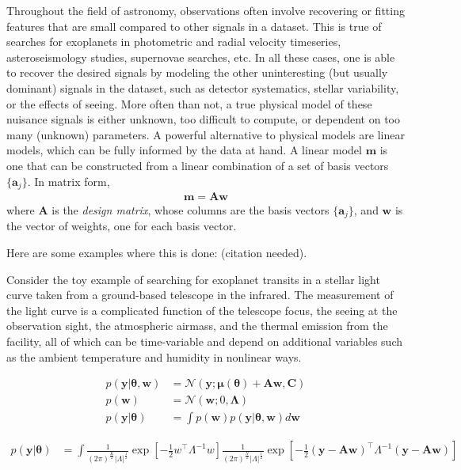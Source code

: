 \documentclass{rnaastex}
\newcommand{\bvec}[1]{{\ensuremath{\boldsymbol{#1}}}}
\newcommand{\citeme}{{\color{red}(citation needed)}}
\newcommand{\Gaussian}[3]{\ensuremath{\frac{1}{(2\pi)^\frac{#3}{2}|#2|^\frac{1}{2}} \exp\left[ -\frac{1}{2}#1^\top #2^{-1} #1 \right]}}
\begin{document}
Throughout the field of astronomy, observations often involve recovering or fitting features that are small compared to other signals in a dataset. This is true of searches for exoplanets in photometric and radial velocity timeseries, asteroseismology studies, supernovae searches, etc. In all these cases, one is able to recover the desired signals by modeling the other uninteresting (but usually dominant) signals in the dataset, such as detector systematics, stellar variability, or the effects of seeing. More often than not, a true physical model of these nuisance signals is either unknown, too difficult to compute, or dependent on too many (unknown) parameters. A powerful alternative to physical models are linear models, which can be fully informed by the data at hand. A linear model $\bvec{m}$ is one that can be constructed from a linear combination of a set of basis vectors $\{\bvec{a}_j\}$. In matrix form,
%
\begin{align}
\bvec{m} = \bvec{A} \bvec{w}
\end{align}
%
where $\bvec{A}$ is the \emph{design matrix}, whose columns are the basis vectors $\{\bvec{a}_j\}$, and $\bvec{w}$ is the vector of weights, one for each basis vector.

Here are some examples where this is done: \citeme.

Consider the toy example of searching for exoplanet transits in a stellar light curve taken from a ground-based telescope in the infrared. The measurement of the light curve is a complicated function of the telescope focus, the seeing at the observation sight, the atmospheric airmass, and the thermal emission from the facility, all of which can be time-variable and depend on additional variables such as the ambient temperature and humidity in nonlinear ways.

\begin{align}
p(\bvec{y} | \bvec{\theta}, \bvec{w}) &= \mathcal{N}(\bvec{y}; \bvec{\mu}(\bvec{\theta}) + \bvec{A}\bvec{w}, \bvec{C}) \nonumber\\
%
p(\bvec{w}) &= \mathcal{N}(\bvec{w}; 0, \bvec{\Lambda}) \nonumber\\
%
p(\bvec{y} | \bvec{\theta}) &= \int p(\bvec{w}) p(\bvec{y} | \bvec{\theta}, \bvec{w}) d\bvec{w}
\end{align}

\begin{align}
p(\bvec{y} | \bvec{\theta}) &=  \int \Gaussian{w}{\Lambda}{K} 
                                     \Gaussian{(\bvec{y} - 
                                                \bvec{A}\bvec{w})}{\Lambda}{N}
    
\end{align}

\citep{Luger:2017,Luger:2016}


\end{document}
